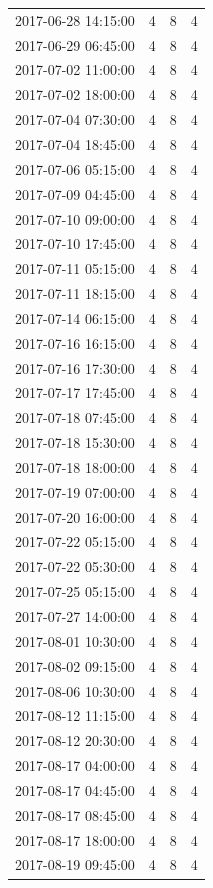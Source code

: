 \begin{tabular}{lrrr}
2017-06-28 14:15:00 & 4 & 8 & 4 \\
2017-06-29 06:45:00 & 4 & 8 & 4 \\
2017-07-02 11:00:00 & 4 & 8 & 4 \\
2017-07-02 18:00:00 & 4 & 8 & 4 \\
2017-07-04 07:30:00 & 4 & 8 & 4 \\
2017-07-04 18:45:00 & 4 & 8 & 4 \\
2017-07-06 05:15:00 & 4 & 8 & 4 \\
2017-07-09 04:45:00 & 4 & 8 & 4 \\
2017-07-10 09:00:00 & 4 & 8 & 4 \\
2017-07-10 17:45:00 & 4 & 8 & 4 \\
2017-07-11 05:15:00 & 4 & 8 & 4 \\
2017-07-11 18:15:00 & 4 & 8 & 4 \\
2017-07-14 06:15:00 & 4 & 8 & 4 \\
2017-07-16 16:15:00 & 4 & 8 & 4 \\
2017-07-16 17:30:00 & 4 & 8 & 4 \\
2017-07-17 17:45:00 & 4 & 8 & 4 \\
2017-07-18 07:45:00 & 4 & 8 & 4 \\
2017-07-18 15:30:00 & 4 & 8 & 4 \\
2017-07-18 18:00:00 & 4 & 8 & 4 \\
2017-07-19 07:00:00 & 4 & 8 & 4 \\
2017-07-20 16:00:00 & 4 & 8 & 4 \\
2017-07-22 05:15:00 & 4 & 8 & 4 \\
2017-07-22 05:30:00 & 4 & 8 & 4 \\
2017-07-25 05:15:00 & 4 & 8 & 4 \\
2017-07-27 14:00:00 & 4 & 8 & 4 \\
2017-08-01 10:30:00 & 4 & 8 & 4 \\
2017-08-02 09:15:00 & 4 & 8 & 4 \\
2017-08-06 10:30:00 & 4 & 8 & 4 \\
2017-08-12 11:15:00 & 4 & 8 & 4 \\
2017-08-12 20:30:00 & 4 & 8 & 4 \\
2017-08-17 04:00:00 & 4 & 8 & 4 \\
2017-08-17 04:45:00 & 4 & 8 & 4 \\
2017-08-17 08:45:00 & 4 & 8 & 4 \\
2017-08-17 18:00:00 & 4 & 8 & 4 \\
2017-08-19 09:45:00 & 4 & 8 & 4 \\

\end{tabular}
